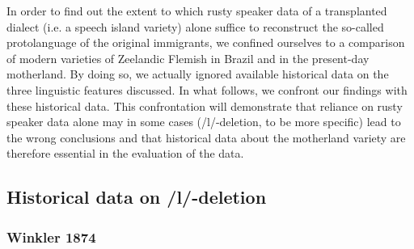\documentclass[output=paper,hidelinks,draftmode]{langscibook}
\begin{document}
In order to find out the extent to which rusty speaker data of a transplanted dialect (i.e. a speech island variety) alone suffice to reconstruct the so-called protolanguage of the original immigrants, we confined ourselves to a comparison of modern varieties of Zeelandic Flemish in Brazil and in the present-day motherland. By doing so, we actually ignored available historical data on the three linguistic features discussed. In what follows, we confront our findings with these historical data. This confrontation will demonstrate that reliance on rusty speaker data alone may in some cases (/l/-deletion, to be more specific) lead to the wrong conclusions and that historical data about the motherland variety are therefore essential in the evaluation of the data. 

\subsection{Historical data on /l/-deletion}
\label{sec:61historical}
\subsubsection{Winkler 1874}
\end{document}
